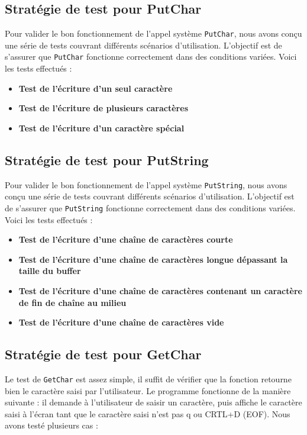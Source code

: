 \documentclass[a4paper,11pt]{article}
\begin{document}
\subsection{Stratégie de test pour PutChar}

Pour valider le bon fonctionnement de l'appel système \texttt{PutChar}, nous avons conçu une série de tests couvrant différents scénarios d'utilisation. L'objectif est de s'assurer que \texttt{PutChar} fonctionne correctement dans des conditions variées.
Voici les tests effectués :

\begin{itemize}
    \item \textbf{Test de l'écriture d'un seul caractère}
    \item \textbf{Test de l'écriture de plusieurs caractères} 
    \item \textbf{Test de l'écriture d'un caractère spécial}
\end{itemize}


\subsection{Stratégie de test pour PutString}

Pour valider le bon fonctionnement de l'appel système \texttt{PutString}, nous avons conçu une série de tests couvrant différents scénarios d'utilisation. L'objectif est de s'assurer que \texttt{PutString} fonctionne correctement dans des conditions variées.
Voici les tests effectués :

\begin{itemize}
    \item \textbf{Test de l'écriture d'une chaîne de caractères courte}
    \item \textbf{Test de l'écriture d'une chaîne de caractères longue dépassant la taille du buffer} 
    \item \textbf{Test de l'écriture d'une chaîne de caractères contenant un caractère de fin de chaîne au milieu}
    \item \textbf{Test de l'écriture d'une chaîne de caractères vide}
\end{itemize}

\subsection{Stratégie de test pour GetChar}

Le test de \texttt{GetChar} est assez simple, il suffit de vérifier que la fonction retourne bien le caractère saisi par l'utilisateur.
Le programme fonctionne de la manière suivante : il demande à l'utilisateur de saisir un caractère, puis affiche le caractère saisi à l'écran tant que le caractère saisi n'est pas q ou CRTL+D (EOF).
Nous avons testé plusieurs cas :
\end{document}
